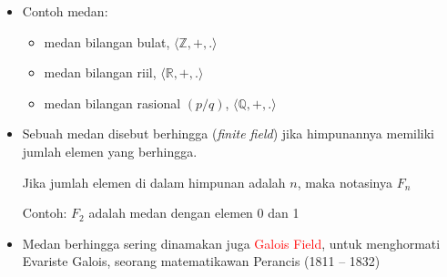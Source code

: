 \documentclass{article}
\begin{document}

\begin{itemize}
    \item Contoh medan:
    \begin{itemize}
        \item medan bilangan bulat, $\langle\mathbb{Z}, +, .\rangle$
        \item medan bilangan riil, $\langle\mathbb{R}, +, .\rangle$
        \item medan bilangan rasional $(p/q)$, $\langle\mathbb{Q}, +, .\rangle$
    \end{itemize}

    \item Sebuah medan disebut berhingga (\textit{finite field}) jika himpunannya memiliki jumlah elemen yang berhingga.
    
    Jika jumlah elemen di dalam himpunan adalah $n$, maka notasinya $F_n$
    
    Contoh: $F_2$ adalah medan dengan elemen 0 dan 1

    \item Medan berhingga sering dinamakan juga \textcolor{red}{Galois Field}, untuk menghormati Evariste Galois, seorang matematikawan Perancis (1811 -- 1832)
\end{itemize}
\end{document}
